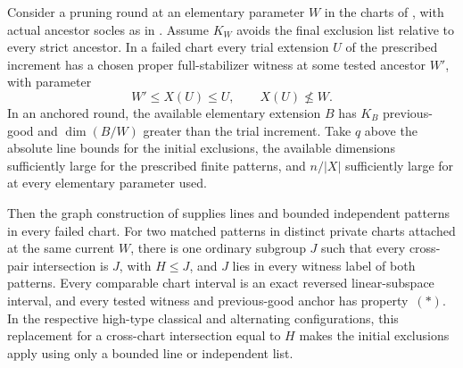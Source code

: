 \begin{lemma}\label{r:linear-patterns}
Consider a pruning round at an elementary parameter $W$ in the charts
of , with actual ancestor socles as in
.  Assume $K_W$ avoids the final exclusion list
relative to every strict ancestor.  In a failed chart every trial
extension $U$ of the prescribed increment has a chosen proper
full-stabilizer witness at some tested ancestor $W'$, with parameter
\[
 W'\le X(U)\le U,\qquad X(U)\not\le W.
\]
In an anchored round, the available elementary extension $B$ has
$K_B$ previous-good and $\dim(B/W)$ greater than the trial increment.
Take $q$ above the absolute line bounds for the initial exclusions,
the available dimensions sufficiently large for the prescribed finite
patterns, and $n/|X|$ sufficiently large for  at
every elementary parameter used.

Then the graph construction of  supplies lines
and bounded independent patterns in every failed chart.  For two matched patterns
in distinct private charts attached at the same current $W$, there is
one ordinary subgroup $J$ such that every cross-pair intersection is
$J$, with $H\le J$, and $J$ lies in every witness label of both patterns.
Every comparable chart interval is an exact reversed linear-subspace
interval, and every tested witness and previous-good anchor has
property~\((*)\).  In the respective high-type classical and alternating
configurations, this replacement for a cross-chart intersection equal to
$H$ makes the initial exclusions apply using only a bounded line or
independent list.
\end{lemma}

